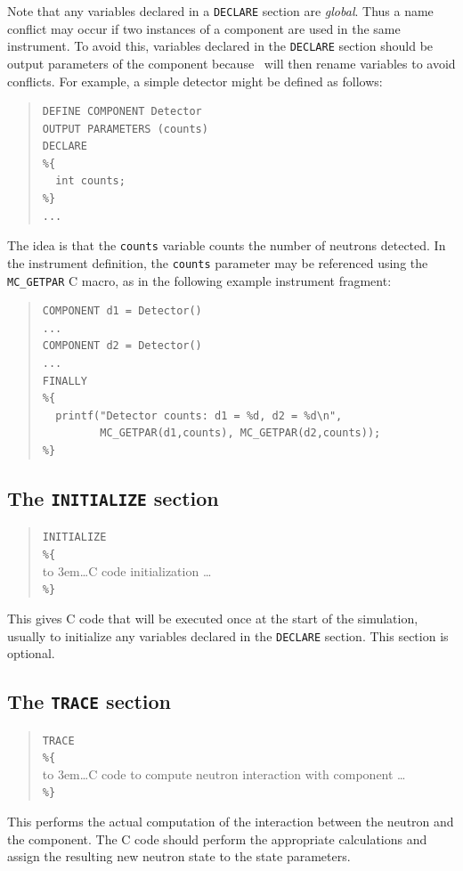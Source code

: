 {Note that any variables declared in a \verb+DECLARE+ section are
\emph{global}. Thus a name conflict may occur if two instances of a
component are used in the same instrument. To avoid this, variables
declared in the \texttt{DECLARE} section should be output parameters of
the component because \MCS\ will then rename variables to avoid conflicts. 
For example, a simple detector might be defined as follows:
\begin{quote}
\begin{verbatim}
DEFINE COMPONENT Detector
OUTPUT PARAMETERS (counts)
DECLARE
%{
  int counts;
%}
...
\end{verbatim}
\end{quote}
The idea is that the \texttt{counts} variable counts the number of
neutrons detected. In the instrument definition, the \texttt{counts}
parameter may be referenced using the \verb+MC_GETPAR+ C macro, as in
the following example instrument fragment:\label{mcgetpar}
\begin{quote}
\begin{verbatim}
COMPONENT d1 = Detector()
...
COMPONENT d2 = Detector()
...
FINALLY
%{
  printf("Detector counts: d1 = %d, d2 = %d\n",
         MC_GETPAR(d1,counts), MC_GETPAR(d2,counts));
%}
\end{verbatim}
\end{quote}


\subsection{The \texttt{INITIALIZE} section}

\begin{quote}
  \texttt{INITIALIZE} \\
  \verb|%{| \\
  \hbox to 3em{}\ldots C code initialization \ldots \\
  \verb|%}|
\end{quote}
This gives C code that will be executed once at the start of the
simulation, usually to initialize any variables declared in the
\texttt{DECLARE} section. This section is optional.


\subsection{The \texttt{TRACE} section}
\label{s:TRACE}

\begin{quote}
  \texttt{TRACE} \\
  \verb|%{| \\
  \hbox to 3em{}\ldots C code to compute neutron interaction with
    component \ldots \\
  \verb|%}|
\end{quote}
This performs the actual computation of the interaction between the neutron
and the component. The C code should perform the appropriate
calculations and assign the resulting new neutron state to the state
parameters.

}
